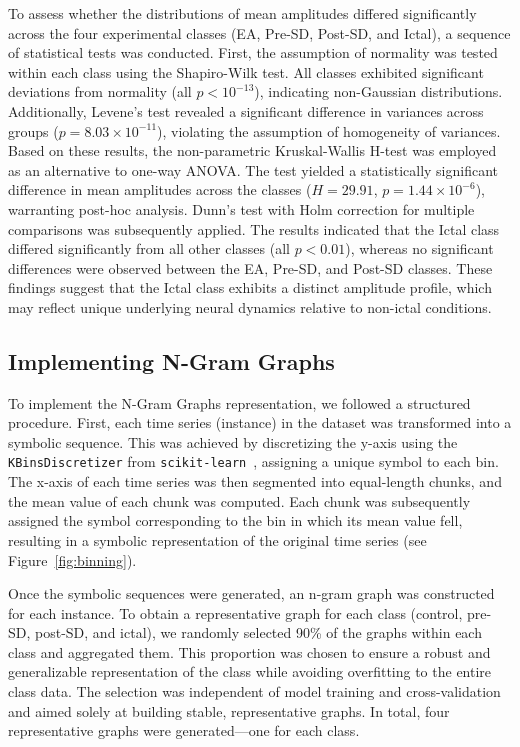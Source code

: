 \documentclass{article}
\begin{document}
To assess whether the distributions of mean amplitudes differed significantly across the four experimental classes (EA, Pre-SD, Post-SD, and Ictal), a sequence of statistical tests was conducted. First, the assumption of normality was tested within each class using the Shapiro-Wilk test. All classes exhibited significant deviations from normality (all $p < 10^{-13}$), indicating non-Gaussian distributions. Additionally, Levene's test revealed a significant difference in variances across groups ($p = 8.03 \times 10^{-11}$), violating the assumption of homogeneity of variances. Based on these results, the non-parametric Kruskal-Wallis H-test was employed as an alternative to one-way ANOVA. The test yielded a statistically significant difference in mean amplitudes across the classes ($H = 29.91$, $p = 1.44 \times 10^{-6}$), warranting post-hoc analysis. Dunn’s test with Holm correction for multiple comparisons was subsequently applied. The results indicated that the Ictal class differed significantly from all other classes (all $p < 0.01$), whereas no significant differences were observed between the EA, Pre-SD, and Post-SD classes. These findings suggest that the Ictal class exhibits a distinct amplitude profile, which may reflect unique underlying neural dynamics relative to non-ictal conditions.

\subsection{Implementing N-Gram Graphs}
To implement the N-Gram Graphs representation, we followed a structured procedure. First, each time series (instance) in the dataset was transformed into a symbolic sequence. This was achieved by discretizing the y-axis using the \texttt{KBinsDiscretizer} from \texttt{scikit-learn}~\cite{scikit-learn}, assigning a unique symbol to each bin. The x-axis of each time series was then segmented into equal-length chunks, and the mean value of each chunk was computed. Each chunk was subsequently assigned the symbol corresponding to the bin in which its mean value fell, resulting in a symbolic representation of the original time series (see Figure~\ref{fig:binning}).

Once the symbolic sequences were generated, an n-gram graph was constructed for each instance. To obtain a representative graph for each class (control, pre-SD, post-SD, and ictal), we randomly selected 90\% of the graphs within each class and aggregated them. This proportion was chosen to ensure a robust and generalizable representation of the class while avoiding overfitting to the entire class data. The selection was independent of model training and cross-validation and aimed solely at building stable, representative graphs. In total, four representative graphs were generated—one for each class.
\end{document}
